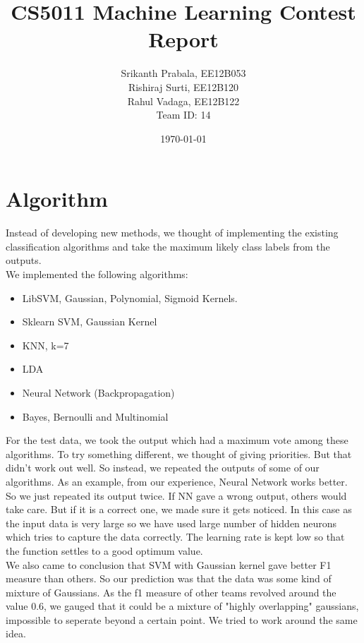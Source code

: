 \documentclass[a4paper]{article}
\title{CS5011 Machine Learning Contest Report}
\author{Srikanth Prabala, EE12B053\\
		Rishiraj Surti, EE12B120\\
		Rahul Vadaga, EE12B122\\
		Team ID: 14
		}
\date{\today}
\begin{document}
\maketitle

\section{Algorithm}
Instead of developing new methods, we thought of implementing the existing classification algorithms and take the maximum likely class labels from the outputs.\\

We implemented the following algorithms:
\begin{itemize}
\item LibSVM, Gaussian, Polynomial, Sigmoid Kernels.
\item Sklearn SVM, Gaussian Kernel
\item KNN, k=7 
\item LDA
\item Neural Network (Backpropagation)
\item Bayes, Bernoulli and Multinomial
\end{itemize}

For the test data, we took the output which had a maximum vote among these algorithms.
To try something different, we thought of giving priorities. But that didn't work out well. So instead, we repeated the outputs of some of our algorithms. As an example, from our experience, Neural Network works better. So we just repeated its output twice. If NN gave a wrong output, others would take care. But if it is a correct one, we made sure it gets noticed. In this case as the input data is very large so we have used large number of hidden neurons which tries to capture the data correctly. The learning rate is kept low so that the function settles to a good optimum value. \\


We also came to conclusion that SVM with Gaussian kernel gave better F1 measure than others. So our prediction was that the data was some kind of mixture of Gaussians. As the f1 measure of other teams revolved around the value 0.6, we gauged that it could be a mixture of "highly overlapping" gaussians, impossible to seperate beyond a certain point. We tried to work around the same idea. 
\end{document}

